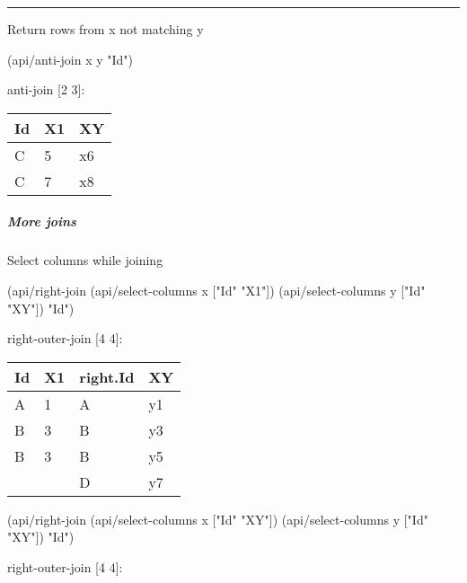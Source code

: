 \documentclass[]{article}
\newenvironment{Shaded}{\begin{snugshade}}{\end{snugshade}}
\newcommand{\NormalTok}[1]{#1}
\newcommand{\StringTok}[1]{\textcolor[rgb]{0.31,0.60,0.02}{#1}}
\let\oldsubparagraph\subparagraph
\renewcommand{\subparagraph}[1]{\oldsubparagraph{#1}\mbox{}}
\begin{document}
\begin{center}\rule{0.5\linewidth}{0.5pt}\end{center}

Return rows from x not matching y

\begin{Shaded}
\begin{Highlighting}[]
\NormalTok{(api/anti-join x y }\StringTok{"Id"}\NormalTok{)}
\end{Highlighting}
\end{Shaded}

anti-join {[}2 3{]}:

\begin{longtable}[]{@{}lll@{}}
\toprule
Id & X1 & XY\tabularnewline
\midrule
\endhead
C & 5 & x6\tabularnewline
C & 7 & x8\tabularnewline
\bottomrule
\end{longtable}

\hypertarget{more-joins}{%
\subparagraph{More joins}\label{more-joins}}

Select columns while joining

\begin{Shaded}
\begin{Highlighting}[]
\NormalTok{(api/right-join (api/select-columns x [}\StringTok{"Id"} \StringTok{"X1"}\NormalTok{])}
\NormalTok{                (api/select-columns y [}\StringTok{"Id"} \StringTok{"XY"}\NormalTok{])}
                \StringTok{"Id"}\NormalTok{)}
\end{Highlighting}
\end{Shaded}

right-outer-join {[}4 4{]}:

\begin{longtable}[]{@{}llll@{}}
\toprule
Id & X1 & right.Id & XY\tabularnewline
\midrule
\endhead
A & 1 & A & y1\tabularnewline
B & 3 & B & y3\tabularnewline
B & 3 & B & y5\tabularnewline
& & D & y7\tabularnewline
\bottomrule
\end{longtable}

\begin{Shaded}
\begin{Highlighting}[]
\NormalTok{(api/right-join (api/select-columns x [}\StringTok{"Id"} \StringTok{"XY"}\NormalTok{])}
\NormalTok{                (api/select-columns y [}\StringTok{"Id"} \StringTok{"XY"}\NormalTok{])}
                \StringTok{"Id"}\NormalTok{)}
\end{Highlighting}
\end{Shaded}

right-outer-join {[}4 4{]}:
\end{document}
